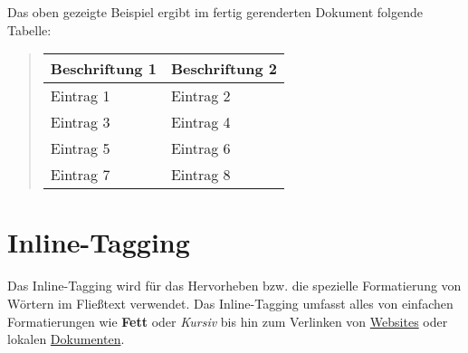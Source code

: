 \documentclass[%
oneside,                 %
final,                   %
chapterprefix=true,      %
open=right,              %
10pt]{book}
\begin{document}
\vspace{3mm}


Das oben gezeigte Beispiel ergibt im fertig gerenderten Dokument folgende Tabelle:


\begin{quote}
\begin{tabular}{ll}
\hline
\multicolumn{1}{l}{ Beschriftung 1 } & \multicolumn{1}{l}{ Beschriftung 2 } \\
\hline
Eintrag 1      & Eintrag 2      \\
Eintrag 3      & Eintrag 4      \\
Eintrag 5      & Eintrag 6      \\
Eintrag 7      & Eintrag 8      \\
\hline
\end{tabular}
\end{quote}

\noindent
\section{Inline-Tagging}
Das Inline-Tagging wird für das Hervorheben bzw. die spezielle Formatierung von Wörtern im Fließtext verwendet. Das Inline-Tagging umfasst alles von einfachen Formatierungen wie \textbf{Fett} oder \emph{Kursiv} bis hin zum Verlinken von \href{{https://github.com/hplgit/doconce}}{Websites} oder lokalen \href{{tools/manual.pdf}}{\textcolor{darkblue2}{Dokumenten}}.


\vspace{3mm}
\end{document}
